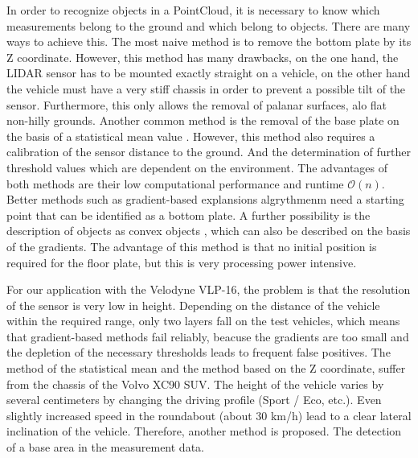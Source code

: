 \documentclass[11pt,oneside,openright]{mpreport}
\begin{document}
In order to recognize objects in a PointCloud, it is necessary to know which measurements belong to the ground and which belong to objects.
There are many ways to achieve this. The most naive method is to remove the bottom plate by its Z coordinate.
However, this method has many drawbacks, on the one hand, the LIDAR sensor has to be mounted exactly straight on a vehicle, 
on the other hand the vehicle must have a very stiff chassis in order to prevent a possible tilt of the sensor. 
Furthermore, this only allows the removal of palanar surfaces, alo flat non-hilly grounds. 
Another common method is the removal of the base plate on the basis of a statistical mean value \cite{Zhang}.
However, this method also requires a calibration of the sensor distance to the ground. 
And the determination of further threshold values ​​which are dependent on the environment.
The advantages of both methods are their low computational performance and runtime $\mathcal{O}(n)$.
Better methods such as gradient-based explansions algrythmenm need a starting point that can be identified as a bottom plate.
A further possibility is the description of objects as convex objects \cite{5164280}, which can also be described on the basis of the gradients.
The advantage of this method is that no initial position is required for the floor plate, but this is very processing power intensive.
% 

For our application with the Velodyne VLP-16, the problem is that the resolution of the sensor is very low in height.
Depending on the distance of the vehicle within the required range, only two layers fall on the test vehicles, which means that gradient-based methods fail reliably,
 beacuse the gradients are too small and the depletion of the necessary thresholds leads to frequent false positives. 
The method of the statistical mean and the method based on the Z coordinate, suffer from the chassis of the Volvo XC90 SUV. 
The height of the vehicle varies by several centimeters by changing the driving profile (Sport / Eco, etc.). Even slightly increased speed in the roundabout (about 30 km/h)
lead to a clear lateral inclination of the vehicle. Therefore, another method is proposed. The detection of a base area in the measurement data.
\end{document}
